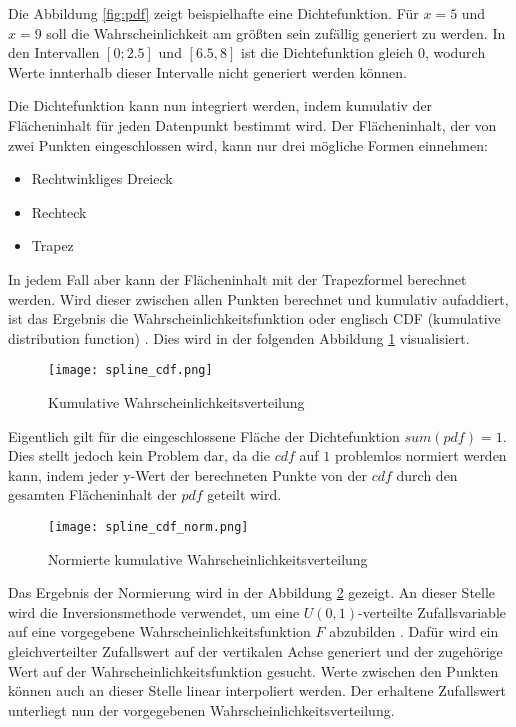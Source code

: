 Die Abbildung \ref{fig:pdf} zeigt beispielhafte eine Dichtefunktion. Für $x=5$ und $x=9$ soll die Wahrscheinlichkeit am größten sein zufällig generiert zu werden. In den Intervallen $[0;2.5]$ und $[6.5,8]$ ist die Dichtefunktion gleich $0$, wodurch Werte innterhalb dieser Intervalle nicht generiert werden können.

Die Dichtefunktion kann nun integriert werden, indem kumulativ der Flächeninhalt für jeden Datenpunkt bestimmt wird. Der Flächeninhalt, der von zwei Punkten eingeschlossen wird, kann nur drei mögliche Formen einnehmen:
\begin{itemize}
    \item Rechtwinkliges Dreieck
    \item Rechteck
    \item Trapez
\end{itemize}
In jedem Fall aber kann der Flächeninhalt mit der Trapezformel berechnet werden. Wird dieser zwischen allen Punkten berechnet und kumulativ aufaddiert, ist das Ergebnis die Wahrscheinlichkeitsfunktion oder englisch CDF (kumulative distribution function) \cite{denker:2008}. Dies wird in der folgenden Abbildung \ref{fig:cdf} visualisiert.

\begin{figure}[H]
    \centering
    \texttt{[image: spline\_cdf.png]}
    \caption{Kumulative Wahrscheinlichkeitsverteilung}\label{fig:cdf}
\end{figure}

Eigentlich gilt für die eingeschlossene Fläche der Dichtefunktion $sum(pdf)=1$. Dies stellt jedoch kein Problem dar, da die $cdf$ auf $1$ problemlos normiert werden kann, indem jeder y-Wert der berechneten Punkte von der $cdf$ durch den gesamten Flächeninhalt der $pdf$ geteilt wird.

\begin{figure}[H]
    \centering
    \texttt{[image: spline\_cdf\_norm.png]}
    \caption{Normierte kumulative Wahrscheinlichkeitsverteilung}\label{fig:cdfnorm}
\end{figure}

Das Ergebnis der Normierung wird in der Abbildung \ref{fig:cdfnorm} gezeigt.
An dieser Stelle wird die Inversionsmethode verwendet, um eine $U(0,1)$-verteilte Zufallsvariable auf eine vorgegebene Wahrscheinlichkeitsfunktion $F$ abzubilden \cite{Inversionsmethode}. Dafür wird ein gleichverteilter Zufallswert auf der vertikalen Achse generiert und der zugehörige Wert auf der Wahrscheinlichkeitsfunktion gesucht. Werte zwischen den Punkten können auch an dieser Stelle linear interpoliert werden. Der erhaltene Zufallswert unterliegt nun der vorgegebenen Wahrscheinlichkeitsverteilung.

